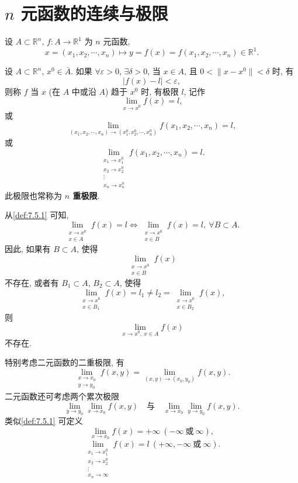 
\section{$n$ 元函数的连续与极限}\label{sec:7.5}

设 $A \subset \mathbb{R}^{n}$, $f\colon A \to \mathbb{R}^{1}$ 为 $n$ 元函数,
\[
  x = (x_{1}, x_{2}, \cdots, x_{n}) \mapsto y = f(x) = f(x_{1}, x_{2}, \cdots, x_{n}) \in \mathbb{R}^{1}.
\]

\begin{definition}\label{def:7.5.1}
设 $A \subset \mathbb{R}^{n}$, $x^{0} \in \overline{A}$. 如果 $\forall \varepsilon > 0$, $\exists \delta > 0$, 当 $x \in A$, 且 $0 < \|x - x^{0}\| < \delta$ 时, 有
\[
  |f(x) - l| < \varepsilon,
\]
则称 $f$ 当 $x$ (在 $A$ 中或沿 $A$) 趋于 $x^{0}$ 时, 有极限 $l$, 记作
\[
  \lim_{x \to x^{0}} f(x) = l,
\]
或
\[
  \lim_{(x_{1}, x_{2}, \cdots, x_{n}) \to (x_{1}^{0}, x_{2}^{0}, \cdots, x_{n}^{0})} f(x_{1}, x_{2}, \cdots, x_{n}) = l,
\]
或
\[
  \lim_{\substack{x_{1} \to x_{1}^{0} \\ x_{2} \to x_{2}^{0} \\ \vdots \\ x_{n} \to x_{n}^{0}}} f(x_{1}, x_{2}, \cdots, x_{n}) = l.
\]
此极限也常称为 \textbf{$n$ 重极限}.
\end{definition}

\begin{remark}\label{rem:7.5.1}
从\cref{def:7.5.1} 可知,
\[
  \lim_{\substack{x \to x^{0} \\ x \in A}} f(x) = l \iff \lim_{\substack{x \to x^{0} \\ x \in B}} f(x) = l,\ \forall B \subset A.
\]
因此, 如果有 $B \subset A$, 使得
\[
  \lim_{\substack{x \to x^{0} \\ x \in B}} f(x)
\]
不存在, 或者有 $B_{1} \subset A$, $B_{2} \subset A$, 使得
\[
  \lim_{\substack{x \to x^{0} \\ x \in B_{1}}} f(x) = l_{1} \neq l_{2} = \lim_{\substack{x \to x^{0} \\ x \in B_{2}}} f(x),
\]
则
\[
  \lim_{x \to x^{0},\ x \in A} f(x)
\]
不存在.

特别考虑二元函数的二重极限, 有
\[
  \lim_{\substack{x \to x_{0} \\ y \to y_{0}}} f(x, y) = \lim_{(x, y) \to (x_{0}, y_{0})} f(x, y).
\]
二元函数还可考虑两个累次极限
\[
  \lim_{y \to y_{0}} \lim_{x \to x_{0}} f(x, y) \quad \text{与} \quad \lim_{x \to x_{0}} \lim_{y \to y_{0}} f(x, y).
\]
类似\cref{def:7.5.1} 可定义
\[
  \lim_{x \to x_{0}} f(x) = +\infty\ (-\infty\ \text{或}\ \infty),
\]
\[
  \lim_{\substack{x_{1} \to x_{1}^{0} \\ x_{2} \to x_{2}^{0} \\ \vdots \\ x_{n} \to \infty}} f(x) = l\ (+\infty, -\infty\ \text{或}\ \infty).
\]
\end{remark}

